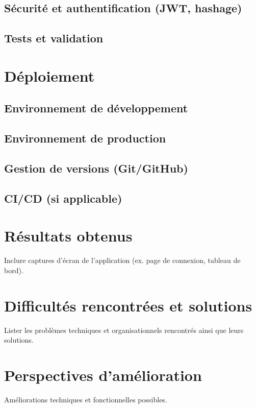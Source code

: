\documentclass[12pt,a4paper]{report}
\begin{document}
\section{Sécurité et authentification (JWT, hashage)}
\section{Tests et validation}

\chapter{Déploiement}
\section{Environnement de développement}
\section{Environnement de production}
\section{Gestion de versions (Git/GitHub)}
\section{CI/CD (si applicable)}

\chapter{Résultats obtenus}
Inclure captures d’écran de l’application (ex. page de connexion, tableau de bord).  

\chapter{Difficultés rencontrées et solutions}
Lister les problèmes techniques et organisationnels rencontrés ainsi que leurs solutions.  

\chapter{Perspectives d’amélioration}
Améliorations techniques et fonctionnelles possibles.  
\end{document}
